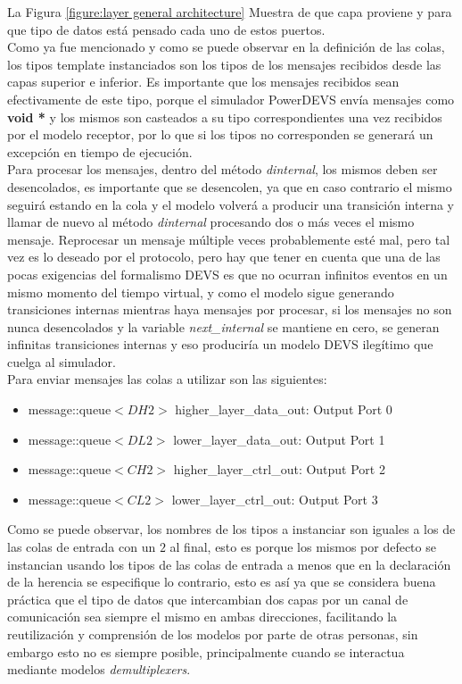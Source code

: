 \documentclass[10pt,a4paper]{article}
\begin{document}
La Figura \ref{figure:layer general architecture} Muestra de que capa proviene y para que tipo de datos está pensado cada uno de estos puertos. \\

Como ya fue mencionado y como se puede observar en la definición de las colas, los tipos template instanciados son los tipos de los mensajes recibidos desde las capas superior e inferior. Es importante que los mensajes recibidos sean efectivamente de este tipo, porque el simulador PowerDEVS envía mensajes como \textbf{void *} y los mismos son casteados a su tipo correspondientes una vez recibidos por el modelo receptor, por lo que si los tipos no corresponden se generará un excepción en tiempo de ejecución. \\

Para procesar los mensajes, dentro del método \textit{dinternal}, los mismos deben ser desencolados, es importante que se desencolen, ya que en caso contrario el mismo seguirá estando en la cola y el modelo volverá a producir una transición interna y llamar de nuevo al método \textit{dinternal} procesando dos o más veces el mismo mensaje. Reprocesar un mensaje múltiple veces probablemente esté mal, pero tal vez es lo deseado por el protocolo, pero hay que tener en cuenta que una de las pocas exigencias del formalismo DEVS es que no ocurran infinitos eventos en un mismo momento del tiempo virtual, y como el modelo sigue generando transiciones internas mientras haya mensajes por procesar, si los mensajes no son nunca desencolados y la variable \textit{next\_internal} se mantiene en cero, se generan infinitas transiciones internas y eso produciría un modelo DEVS ilegítimo que cuelga al simulador. \\

Para enviar mensajes las colas a utilizar son las siguientes:
\begin{itemize}
\item message::queue$<DH2>$ higher\_layer\_data\_out: Output Port 0 
\item message::queue$<DL2>$ lower\_layer\_data\_out:  Output Port 1
\item message::queue$<CH2>$ higher\_layer\_ctrl\_out: Output Port 2
\item message::queue$<CL2>$ lower\_layer\_ctrl\_out:  Output Port 3
\end{itemize}

Como se puede observar, los nombres de los tipos a instanciar son iguales a los de las colas de entrada con un $2$ al final, esto es porque los mismos por defecto se instancian usando los tipos de las colas de entrada a menos que en la declaración de la herencia se especifique lo contrario, esto es así ya que se considera buena práctica que el tipo de datos que intercambian dos capas por un canal de comunicación sea siempre el mismo en ambas direcciones, facilitando la reutilización y comprensión de los modelos por parte de otras personas, sin embargo esto no es siempre posible, principalmente cuando se interactua mediante modelos \textit{demultiplexers}. \\
\end{document}
